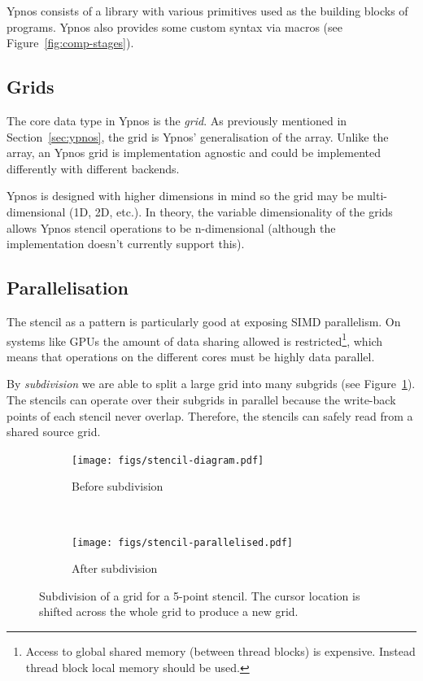 \documentclass[
    12pt,
    a4paper,
    twoside,
    openright,
    ]{scrbook}
\begin{document}
Ypnos consists of a library with various primitives used as the building blocks
of programs. Ypnos also provides some custom syntax via macros (see
Figure~\ref{fig:comp-stages}).

\subsection{Grids}

The core data type in Ypnos is the \emph{grid}. As previously mentioned in
Section~\ref{sec:ypnos}, the grid is Ypnos' generalisation of the array. Unlike
the array, an Ypnos grid is implementation agnostic and could be implemented
differently with different backends.

Ypnos is designed with higher dimensions in mind so the grid may be
multi-dimensional (1D, 2D, etc.). In theory, the variable dimensionality of the
grids allows Ypnos stencil operations to be n-dimensional (although the
implementation doesn't currently support this).

\subsection{Parallelisation}

The stencil as a pattern is particularly good at exposing SIMD parallelism. On
systems like GPUs the amount of data sharing allowed is
restricted\footnote{Access to global shared memory (between thread blocks) is
  expensive. Instead thread block local memory should be used.}, which means
that operations on the different cores must be highly data parallel.

By \emph{subdivision} we are able to split a large grid into many subgrids (see
Figure~\ref{fig:sten-decomp}). The stencils can operate over their subgrids in
parallel because the write-back points of each stencil never overlap. Therefore,
the stencils can safely read from a shared source grid.

\begin{figure}[h]
\centering
\begin{subfigure}{0.45\textwidth}
\centering
\texttt{[image: figs/stencil-diagram.pdf]}
\caption{Before subdivision}
\end{subfigure}
~
\begin{subfigure}{0.45\textwidth}
\centering
\texttt{[image: figs/stencil-parallelised.pdf]}
\caption{After subdivision}
\end{subfigure}
\caption{Subdivision of a grid for a 5-point stencil. The cursor location is
  shifted across the whole grid to produce a new grid.}
\label{fig:sten-decomp}
\end{figure}
\end{document}
